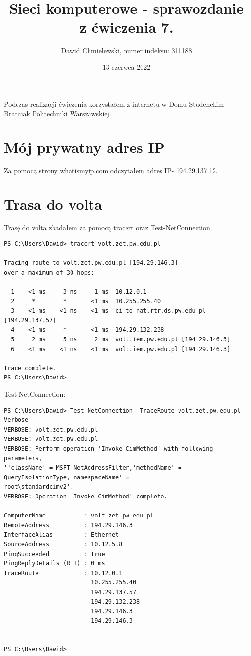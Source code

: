 \documentclass[a4paper,11pt]{article}
\begin{document}
\title{ Sieci komputerowe - sprawozdanie z ćwiczenia 7. }
\author{ Dawid Chmielewski, numer indeksu: 311188 }
\date{13 czerwca 2022}


Podczas realizacji ćwiczenia korzystałem z internetu w Domu Studenckim Bratniak Politechniki Warszawskiej.

\section{Mój prywatny adres IP}

Za pomocą strony whatismyip.com odczytałem adres IP- 194.29.137.12.


\section{Trasa do volta}

Trasę do volta zbadałem za pomocą tracert oraz Test-NetConnection.

\begin{verbatim}
PS C:\Users\Dawid> tracert volt.zet.pw.edu.pl

Tracing route to volt.zet.pw.edu.pl [194.29.146.3]
over a maximum of 30 hops:

  1    <1 ms     3 ms     1 ms  10.12.0.1
  2     *        *       <1 ms  10.255.255.40
  3    <1 ms    <1 ms    <1 ms  ci-to-nat.rtr.ds.pw.edu.pl [194.29.137.57]
  4    <1 ms     *       <1 ms  194.29.132.238
  5     2 ms     5 ms     2 ms  volt.iem.pw.edu.pl [194.29.146.3]
  6    <1 ms    <1 ms    <1 ms  volt.iem.pw.edu.pl [194.29.146.3]

Trace complete.
PS C:\Users\Dawid>
\end{verbatim}

Test-NetConnection:

\begin{verbatim}
PS C:\Users\Dawid> Test-NetConnection -TraceRoute volt.zet.pw.edu.pl -Verbose
VERBOSE: volt.zet.pw.edu.pl
VERBOSE: volt.zet.pw.edu.pl
VERBOSE: Perform operation 'Invoke CimMethod' with following parameters, 
''className' = MSFT_NetAddressFilter,'methodName' = QueryIsolationType,'namespaceName' = 
root\standardcimv2'.
VERBOSE: Operation 'Invoke CimMethod' complete.

ComputerName           : volt.zet.pw.edu.pl
RemoteAddress          : 194.29.146.3
InterfaceAlias         : Ethernet
SourceAddress          : 10.12.5.8
PingSucceeded          : True
PingReplyDetails (RTT) : 0 ms
TraceRoute             : 10.12.0.1
                         10.255.255.40
                         194.29.137.57
                         194.29.132.238
                         194.29.146.3
                         194.29.146.3


PS C:\Users\Dawid>
\end{verbatim}
\end{document}
